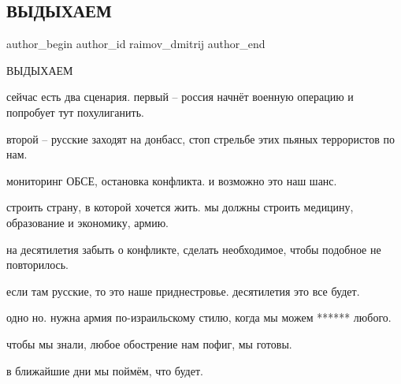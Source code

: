  
 
 
 
 
 
\subsection{ВЫДЫХАЕМ}
\label{sec:22_02_2022.fb.raimov_dmitrij.1.vydyhajem}
 
\ifcmt
 author_begin
   author_id raimov_dmitrij
 author_end
\fi

ВЫДЫХАЕМ

сейчас есть два сценария. первый – россия начнёт военную операцию и попробует
тут похулиганить. 

второй – русские заходят на донбасс, стоп стрельбе этих пьяных террористов по
нам.

мониторинг ОБСЕ, остановка конфликта. и возможно это наш шанс.

строить страну, в которой хочется жить. мы должны строить медицину, образование
и экономику, армию.

на десятилетия забыть о конфликте, сделать необходимое, чтобы подобное не
повторилось.

если там русские, то это наше приднестровье. десятилетия это все будет.

одно но. нужна армия по-израильскому стилю, когда мы можем ****** любого.

чтобы мы знали, любое обострение нам пофиг, мы готовы.

в ближайшие дни мы поймём, что будет.
